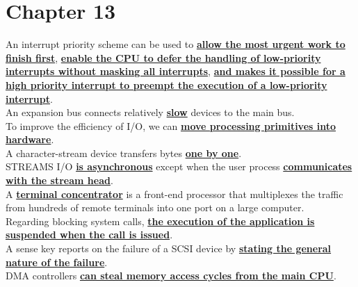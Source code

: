 \documentclass[10pt]{article}
\newcommand{\qw}[1]{\textbf{\ul{#1}}}
\begin{document}
\section*{\centering Chapter 13}
An interrupt priority scheme can be used to \qw{allow the most urgent work to finish first}, \qw{enable the CPU to defer the handling of low-priority interrupts without masking all interrupts}, \qw{and makes it possible for a high priority interrupt to preempt the execution of a low-priority interrupt}.\\[2mm]
An expansion bus connects relatively \qw{slow} devices to the main bus.\\[2mm]
To improve the efficiency of I/O, we can \qw{move processing primitives into hardware}.\\[2mm]
A character-stream device transfers bytes \qw{one by one}.\\[2mm]
STREAMS I/O \qw{is asynchronous} except when the user process \qw{communicates with the stream head}.\\[2mm]
A \qw{terminal concentrator} is a front-end processor that multiplexes the traffic from hundreds of remote terminals into one port on a large computer.\\[2mm]
Regarding blocking system calls, \qw{the execution of the application is suspended when the call is issued}.\\[2mm]
A sense key reports on the failure of a SCSI device by \qw{stating the general nature of the failure}.\\[2mm]
DMA controllers \qw{can steal memory access cycles from the main CPU}.\\[2mm]
\newpage
\end{document}
